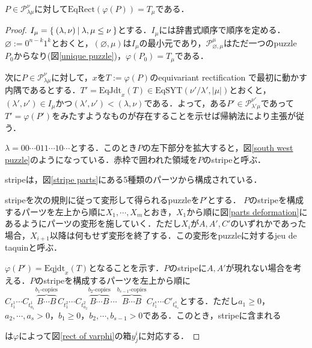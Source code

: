 \begin{prop}\label{main theorem 1}
  $P\in\mathcal{P}^\nu_{\lambda\mu}$に対して$\text{EqRect}(\varphi(P))=T_\mu$である．
\end{prop}

\begin{proof}
  $I_{\mu} = \left\{\:(\lambda,\nu)\:\middle|\:\lambda,\mu \leq \nu\:\right\}$とする．$I_{\mu}$には辞書式順序で順序を定める．$\varnothing:=0^{n-k}1^k$とおくと，$(\varnothing,\mu)$は$I_{\mu}$の最小元であり，$\mathcal{P}^\mu_{\varnothing,\mu}$はただ一つのpuzzle $P_0$からなり(図\ref{unique puzzle})，$\varphi(P_0)=T_\mu$である．
  
  

  次に$P\in\mathcal{P}^\nu_{\lambda\mu}$に対して，$x$を$T:=\varphi(P)$のequivariant rectification で最初に動かす内隅であるとする．$T'=\text{EqJdt}_{x}(T)\in \text{EqSYT}(\nu'/\lambda',|\mu|)$とおくと，$(\lambda',\nu')\in I_{\mu}$かつ$(\lambda',\nu') < (\lambda,\nu)$である．よって，ある$P'\in\mathcal{P}^{\nu'}_{\lambda'\mu}$であって$T' = \varphi(P')$をみたすようなものが存在することを示せば帰納法により主張が従う．

  $\lambda=00\cdots011\cdots10\cdots$とする．このとき$P$の左下部分を拡大すると，図\ref{south west puzzle}のようになっている．赤枠で囲われた領域を$P$のstripeと呼ぶ．

  

  stripeは，図\ref{stripe parts}にある5種類のパーツから構成されている．

  
  
  stripeを次の規則に従って変形して得られるpuzzleを$P'$とする．
  $P$のstripeを構成するパーツを左上から順に$X_1,\cdots,X_m$とおき，$X_1$から順に図\ref{parts deformation}にあるようにパーツの変形を施していく．ただし$X_i$が$A,A',C'$のいずれかであった場合，$X_{i+1}$以降は何もせず変形を終了する．この変形をpuzzleに対するjeu de taquinと呼ぶ．

  

  $\varphi(P') =\text{Eqjdt}_x(T)$となることを示す．$P$のstripeに$A,A'$が現れない場合を考える．$P$のstripeを構成するパーツを左上から順に$C_{t^1_1}\cdots C_{t^1_{a_1}}\overbrace{B\cdots B}^{b_1\text{-copies}} C_{t^2_1}\cdots C_{t^2_{a_2}} \overbrace{B\cdots B}^{b_2\text{-copies}}\cdots \overbrace{B\cdots B}^{b_{s-1}\text{-copies}} C_{t^s_1}\cdots C'_{t^s_{a_s}}$とする．ただし$a_1\geq 0$，$a_2,\cdots,a_s>0$，$b_1\geq 0$，$b_2,\cdots,b_{s-1}>0$である．このとき，stripeに含まれる
  は$\varphi$によって図\ref{rect of varphi}の箱$y^i_j$に対応する．


\end{proof}
